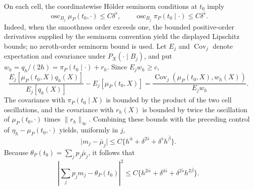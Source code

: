 On each cell, the coordinatewise H\"older seminorm conditions at \(t_0\) imply
\[
\operatorname{osc}_{B_j}\mu_P(t_0,\cdot)\le C\delta^{\bar s},
\qquad
\operatorname{osc}_{B_j}\pi_P(t_0\mid\cdot)\le C\delta^{\bar s}.
\]
Indeed, when the smoothness order exceeds one, the bounded positive-order derivatives supplied by the seminorm convention yield the displayed Lipschitz bounds; no zeroth-order seminorm bound is used. Let \(E_j\) and \(\operatorname{Cov}_j\) denote expectation and covariance under \(P_X(\cdot\mid B_j)\), and put \(w_h=q_h/(2h)=\pi_P(t_0\mid\cdot)+r_h\). Since \(E_jw_h\ge c\),
\[
\frac{E_j[\mu_P(t_0,X)q_h(X)]}{E_j[q_h(X)]}-E_j[\mu_P(t_0,X)]
=
\frac{\operatorname{Cov}_j(\mu_P(t_0,X),w_h(X))}{E_jw_h}.
\]
The covariance with \(\pi_P(t_0\mid X)\) is bounded by the product of the two cell oscillations, and the covariance with \(r_h(X)\) is bounded by twice the oscillation of \(\mu_P(t_0,\cdot)\) times \(\lVert r_h\rVert_\infty\). Combining these bounds with the preceding control of \(\eta_h-\mu_P(t_0,\cdot)\) yields, uniformly in \(j\),
\[
\lvert m_j-\bar\mu_j\rvert
\le C\{h^{\bar\alpha}+\delta^{2\bar s}+\delta^{\bar s}h^{\bar\beta}\}.
\]
Because \(\theta_P(t_0)=\sum_jp_j\bar\mu_j\), it follows that
\[
\left\lvert\sum_jp_jm_j-\theta_P(t_0)\right\rvert^2
\le C\{h^{2\bar\alpha}+\delta^{4\bar s}+\delta^{2\bar s}h^{2\bar\beta}\}.
\]

